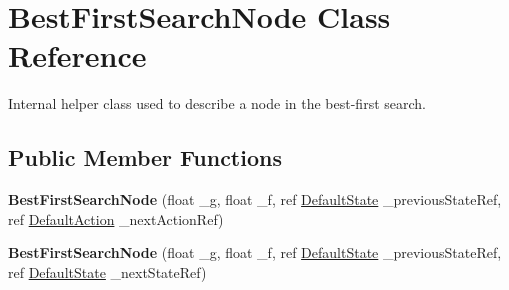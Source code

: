 \hypertarget{class_best_first_search_node}{\section{Best\-First\-Search\-Node Class Reference}
\label{class_best_first_search_node}
}


Internal helper class used to describe a node in the best-\/first search.  


\subsection*{Public Member Functions}
\begin{DoxyCompactItemize}
\item 
\hypertarget{class_best_first_search_node_afda8aef3a27e03d5d6252058970ea2f1}{{\bfseries Best\-First\-Search\-Node} (float \-\_\-g, float \-\_\-f, ref \hyperlink{class_default_state}{Default\-State} \-\_\-previous\-State\-Ref, ref \hyperlink{class_default_action}{Default\-Action} \-\_\-next\-Action\-Ref)}\label{class_best_first_search_node_afda8aef3a27e03d5d6252058970ea2f1}

\item 
\hypertarget{class_best_first_search_node_a4f3a23969ff7be7dcc574232dc2c6344}{{\bfseries Best\-First\-Search\-Node} (float \-\_\-g, float \-\_\-f, ref \hyperlink{class_default_state}{Default\-State} \-\_\-previous\-State\-Ref, ref \hyperlink{class_default_state}{Default\-State} \-\_\-next\-State\-Ref)}\label{class_best_first_search_node_a4f3a23969ff7be7dcc574232dc2c6344}

\end{DoxyCompactItemize}
